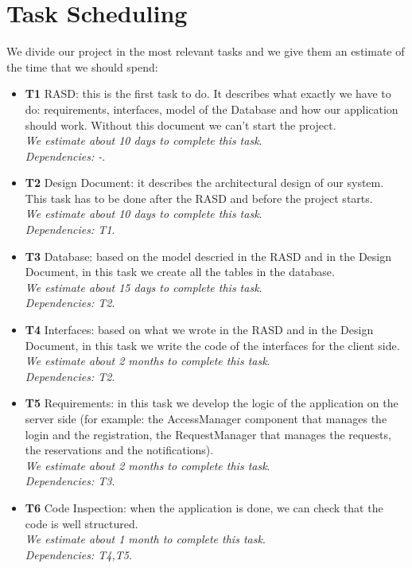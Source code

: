 \documentclass[18pt,oneside,a4paper, titlepage]{article}
\begin{document}
\section{Task Scheduling}
	We divide our project in the most relevant tasks and we give them an estimate of the time that we should spend:
	\begin{itemize}
		\item \textbf{T1} RASD: this is the first task to do. It describes what exactly we have to do: requirements, interfaces, model of the Database and how our application should work. Without this document we can't start the project.\\ \textit{We estimate about 10 days to complete this task}.\\ \textit{Dependencies: -}.
		\item \textbf{T2} Design Document: it describes the architectural design of our system. This task has to be done after the RASD and before the project starts.\\ \textit{We estimate about 10 days to complete this task}.\\ \textit{Dependencies: T1}.
		\item \textbf{T3} Database: based on the model descried in the RASD and in the Design Document, in this task we create all the tables in the database.\\ \textit{We estimate about 15 days to complete this task}.\\ \textit{Dependencies: T2}.
		\item \textbf{T4} Interfaces: based on what we wrote in the RASD and in the Design Document, in this task we write the code of the interfaces for the client side.\\ \textit{We estimate about 2 months to complete this task}.\\ \textit{Dependencies: T2}.
		\item \textbf{T5} Requirements: in this task we develop the logic of the application on the server side (for example: the AccessManager component that manages the login and the registration, the RequestManager that manages the requests, the reservations and the notifications).\\ \textit{We estimate about 2 months to complete this task}.\\ \textit{Dependencies: T3}.
		\item \textbf{T6} Code Inspection: when the application is done, we can check that the code is well structured.\\ \textit{We estimate about 1 month to complete this task}.\\ \textit{Dependencies: T4,T5}.

\end{itemize}
\end{document}
